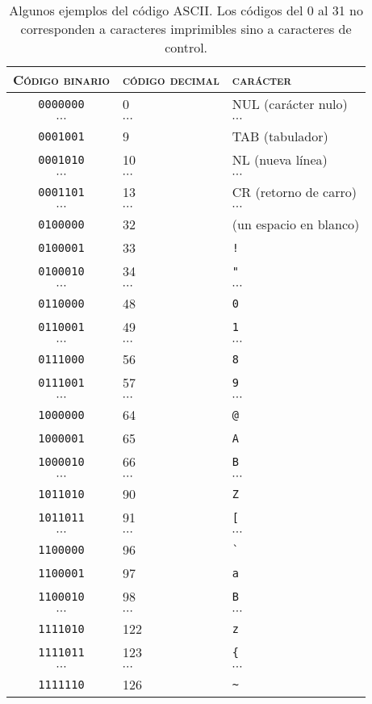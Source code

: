 \begin{table} \begin{center} \begin{tabular}{c|l|l} \hline\hline \textsc{Código binario} &\textsc{código decimal} &\textsc{carácter} \\ \hline

\texttt{0000000} &0 &NUL (carácter nulo) \\ $\cdots$ &$\cdots$ &$\cdots$ \\ \texttt{0001001} &9 &TAB (tabulador) \\ \texttt{0001010} &10 &NL (nueva línea) \\ $\cdots$ &$\cdots$ &$\cdots$ \\ \texttt{0001101} &13 &CR (retorno de carro) \\ $\cdots$ &$\cdots$ &$\cdots$ \\ \texttt{0100000} &32 &(un espacio en blanco) \\ \texttt{0100001} &33 &\texttt{!} \\ \texttt{0100010} &34 &\verb+"+ \\ $\cdots$ &$\cdots$ &$\cdots$ \\ \texttt{0110000} &48 &\texttt{0} \\ \texttt{0110001} &49 &\texttt{1} \\ $\cdots$ &$\cdots$ &$\cdots$ \\ \texttt{0111000} &56 &\texttt{8} \\ \texttt{0111001} &57 &\texttt{9} \\ $\cdots$ &$\cdots$ &$\cdots$ \\ \texttt{1000000} &64 &\texttt{@} \\ \texttt{1000001} &65 &\texttt{A} \\ \texttt{1000010} &66 &\texttt{B} \\ $\cdots$ &$\cdots$ &$\cdots$ \\ \texttt{1011010} &90 &\texttt{Z} \\ \texttt{1011011} &91 &\texttt{[} \\ $\cdots$ &$\cdots$ &$\cdots$ \\ \texttt{1100000} &96 &\verb+`+ \\ \texttt{1100001} &97 &\texttt{a} \\ \texttt{1100010} &98 &\texttt{B} \\ $\cdots$ &$\cdots$ &$\cdots$ \\ \texttt{1111010} &122 &\texttt{z} \\ \texttt{1111011} &123 &\verb+{+ \\ $\cdots$ &$\cdots$ &$\cdots$ \\ \texttt{1111110} &126 &\verb+~+ \\ \end{tabular} \end{center} \caption{Algunos ejemplos del código ASCII. Los códigos del 0 al 31 no corresponden a caracteres imprimibles sino a caracteres de control.} \label{tb:ASCII} \end{table} 

